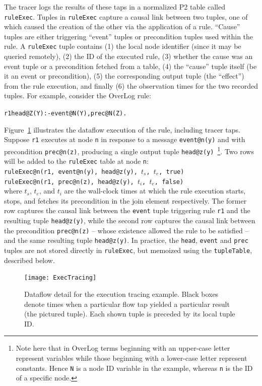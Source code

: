 \documentclass{sig-alt-full}
\def\Sys{P2\xspace}
\def\Lang{OverLog\xspace}
\newenvironment{overlog}{\begin{alltt}\footnotesize}{\end{alltt}}
\newcommand{\ol}[1]{{\tt\footnotesize#1}}
\begin{document}
The tracer logs the results of these taps in a normalized \Sys table called
\ol{ruleExec}.  Tuples in \ol{ruleExec} capture a causal link between
two tuples, one of which caused the creation of the other via the
application of a rule.  ``Cause'' tuples are either triggering ``event''
tuples or precondition tuples used within the rule.  A \ol{ruleExec}
tuple contains (1) the local node identifier 
(since it may be queried remotely), (2) the ID of the executed rule, (3) whether
the cause was an event tuple 
or a precondition fetched from a table, (4) the
``cause'' tuple itself (be it an event or precondition), (5) the
corresponding output tuple (the ``effect'') from the rule execution, and
finally (6) the observation times for the two recorded tuples.  For example, consider the
OverLog rule:
\begin{overlog}
r1 head@Z(Y) :- event@N(Y), prec@N(Z).
\end{overlog}
Figure~\ref{fig:ExecTracing} illustrates the dataflow execution of the
rule, including tracer taps.  Suppose \ol{r1} executes at node \ol{n} in
response to a message \ol{event@n(y)} and with
precondition \ol{prec@n(z)}, producing a single output tuple
\ol{head@z(y)}~\footnote{Note here that in \Lang terms beginning with an
  upper-case letter represent
  variables while those beginning with a lower-case letter represent
  constants.  Hence \ol{N} is a node ID variable in the example, whereas
  \ol{n} is the ID of a specific node.}.   Two rows will be added to the \ol{ruleExec}
table at node \ol{n}: \\
\ol{ruleExec@n(r1, event@n(y), head@z(y), $t_s$, $t_e$, true)} \\
\ol{ruleExec@n(r1, prec@n(z), head@z(y), $t_i$, $t_e$, false)} \\
where $t_s$, $t_e$, and $t_i$ are the wall-clock times at which the
rule execution starts, stops, and fetches its precondition in the join
element respectively.  The former row captures the causal link
between the \ol{event} tuple triggering rule \ol{r1} and the resulting tuple
\ol{head@z(y)}, while the second row captures the causal link between the
precondition \ol{prec@n(z)} -- whose existence allowed the rule to be
satisfied -- and the same resulting tuple \ol{head@z(y)}.  In practice, the \ol{head}, \ol{event} and
\ol{prec} tuples are not stored directly in \ol{ruleExec}, but memoized
using the \ol{tupleTable}, described below. 

\begin{figure}
\centerline{\texttt{[image: ExecTracing]}}
\caption{Dataflow detail for the execution tracing example.  Black boxes
  denote times when a particular flow tap yielded a particular result
  (the pictured tuple).  Each shown tuple is preceded by its local tuple
  ID.}
\label{fig:ExecTracing}
\end{figure}
\end{document}
